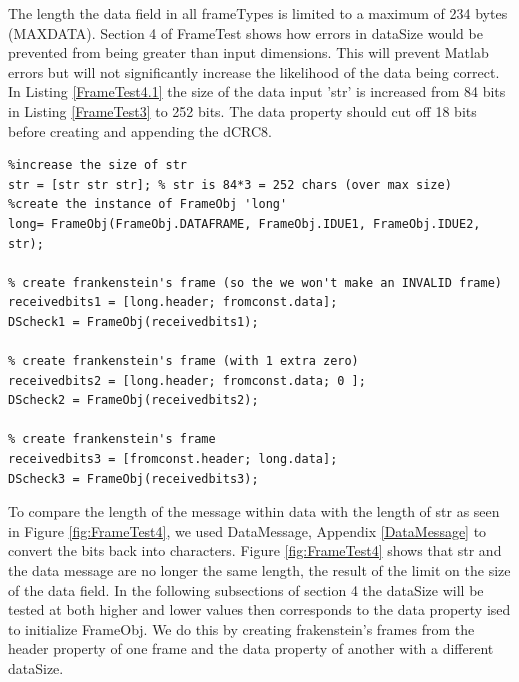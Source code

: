 The length the data field in all frameTypes is limited to a maximum of 234 bytes (MAXDATA). Section 4 of FrameTest shows how errors in dataSize would be prevented from being greater than input dimensions. This will prevent Matlab errors but will not significantly increase the likelihood of the data being correct. In Listing \ref{FrameTest4.1} the size of the data input 'str' is increased from 84 bits in Listing \ref{FrameTest3} to 252 bits. The data property should cut off 18 bits before creating and appending the dCRC8.

\begin{lstlisting} 
%increase the size of str
str = [str str str]; % str is 84*3 = 252 chars (over max size)
%create the instance of FrameObj 'long'
long= FrameObj(FrameObj.DATAFRAME, FrameObj.IDUE1, FrameObj.IDUE2, str);

% create frankenstein's frame (so the we won't make an INVALID frame)
receivedbits1 = [long.header; fromconst.data];
DScheck1 = FrameObj(receivedbits1);

% create frankenstein's frame (with 1 extra zero)
receivedbits2 = [long.header; fromconst.data; 0 ];
DScheck2 = FrameObj(receivedbits2);

% create frankenstein's frame
receivedbits3 = [fromconst.header; long.data];
DScheck3 = FrameObj(receivedbits3);
\end{lstlisting} 

To compare the length of the message within data with the length of str as seen in Figure \ref{fig:FrameTest4}, we used DataMessage, Appendix \ref{DataMessage} to convert the bits back into characters.  Figure \ref{fig:FrameTest4} shows that str and the data message are no longer the same length, the result of the limit on the size of the data field. In the following subsections of section 4 the dataSize will be tested at both higher and lower values then corresponds to the data property ised to initialize FrameObj. We do this by creating frakenstein's frames from the header property of one frame and the data property of another with a different dataSize. 

